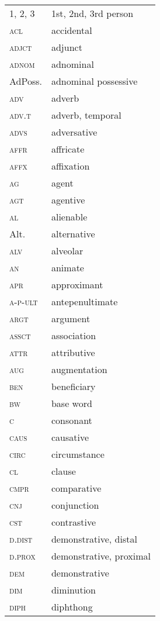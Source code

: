 \begin{tabularx}{.45\textwidth}{lX} 
1, 2, 3 & 1st, 2nd, 3rd person\\
\textsc{acl} & accidental\\
\textsc{adjct} & adjunct\\
\textsc{adnom} & adnominal\\
AdPoss. & adnominal possessive\\
\textsc{adv} & ad{verb}\\
\textsc{adv.t} & ad{verb}, temporal\\
\textsc{advs} & {adversative}\\
\textsc{affr} & affricate\\
\textsc{affx} & {affixation}\\
\textsc{ag} & agent\\
\textsc{agt} & agentive\\
\textsc{al} & alienable\\
Alt. & alternative\\
\textsc{alv} & alveolar\\
\textsc{an} & animate\\
\textsc{apr} & approximant\\
\textsc{a-p-ult} & antepenultimate\\
\textsc{argt} & argument\\
\textsc{assct} & association\\
\textsc{attr} & attributive\\
\textsc{aug} & augmentation\\
\textsc{ben} & beneficiary\\
\textsc{bw} & base word\\
\textsc{c} & consonant\\
\textsc{caus} & {causative}\\
\textsc{circ} & circumstance\\
\textsc{cl} & clause\\
\textsc{cmpr} & comparative\\
\textsc{cnj} & {conjunction}\\
\textsc{cst} & contrastive\\
\textsc{d.dist} & {demonstrative}, distal\\
\textsc{d.prox} & {demonstrative}, proximal\\
\textsc{dem} & {demonstrative}\\
\textsc{dim} & diminution\\
\textsc{diph} & diphthong\\
\end{tabularx} 
